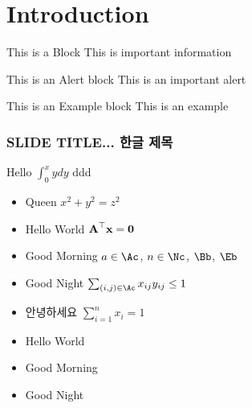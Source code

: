 



\frame[plain]{\titlepage}





\section[INTRO]{Introduction}

\begin{frame}

   \begin{block}{This is a Block}
      This is important information
   \end{block}

\pause

   \begin{alertblock}{This is an Alert block}
   This is an important alert
   \end{alertblock}

\pause

   \begin{exampleblock}{This is an Example block}
   This is an example 
   \end{exampleblock}

\end{frame}


\begin{frame}
\frametitle{SLIDE TITLE... 한글 제목}

Hello $\int_0^x y dy$ \alert<2>{ddd}
\begin{itemize}
\item Queen $x^2 + y^2 = z^2$
\item Hello World $\boldsymbol{\mathbf{A}}^\top \boldsymbol{\mathbf{x}} = \boldsymbol{\mathbf{0}}$
\item Good Morning $a\in\Ac$, $n\in\Nc$, $\Bb$, $\Eb$
\item Good Night $\sum_{(i,j)\in\Ac} x_{ij} y_{ij} \leq 1$ 
\item 안녕하세요 $\textstyle\sum_{i=1}^n x_i = 1$
\end{itemize}

\begin{itemize}
\item<1-> Hello \alert{World}
\item<2-> Good \alert{Morning}
\item<3-> Good \alert{Night}
\end{itemize}

\end{frame}



